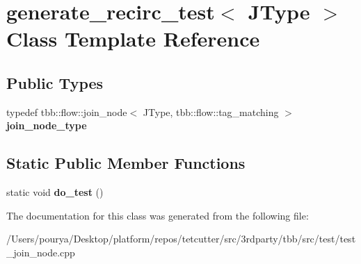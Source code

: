 \hypertarget{classgenerate__recirc__test}{}\section{generate\+\_\+recirc\+\_\+test$<$ J\+Type $>$ Class Template Reference}
\label{classgenerate__recirc__test}
\subsection*{Public Types}
\begin{DoxyCompactItemize}
\item 
\hypertarget{classgenerate__recirc__test_a31ddf21c46b7be69601dbb10b9323b7d}{}typedef tbb\+::flow\+::join\+\_\+node$<$ J\+Type, tbb\+::flow\+::tag\+\_\+matching $>$ {\bfseries join\+\_\+node\+\_\+type}\label{classgenerate__recirc__test_a31ddf21c46b7be69601dbb10b9323b7d}

\end{DoxyCompactItemize}
\subsection*{Static Public Member Functions}
\begin{DoxyCompactItemize}
\item 
\hypertarget{classgenerate__recirc__test_ada6f3132f7bd6de8c47ab7385aaf3e0c}{}static void {\bfseries do\+\_\+test} ()\label{classgenerate__recirc__test_ada6f3132f7bd6de8c47ab7385aaf3e0c}

\end{DoxyCompactItemize}


The documentation for this class was generated from the following file\+:\begin{DoxyCompactItemize}
\item 
/\+Users/pourya/\+Desktop/platform/repos/tetcutter/src/3rdparty/tbb/src/test/test\+\_\+join\+\_\+node.\+cpp\end{DoxyCompactItemize}
